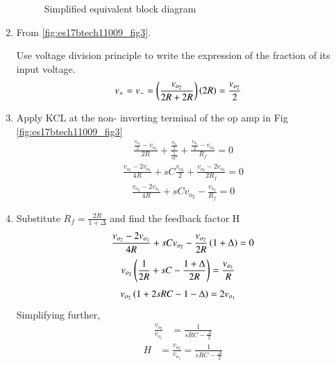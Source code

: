 \begin{enumerate}[label=\thesubsection.\arabic*.,ref=\thesubsection.\theenumi]
\renewcommand{\thefigure}{\theenumi.\arabic{figure}}
\begin{figure}[!ht]
	\begin{center}
		\resizebox{\columnwidth}{!}{}
	\end{center}
\caption{Simplified equivalent block diagram}
\label{fig:es17btech11009_block}
\end{figure}

\item
From \ref{fig:es17btech11009_fig3}.

Use voltage division principle to write the expression of the fraction of its input voltage.
\begin{align}
v_{+}&= v_{-}=\left(\frac{v_{o_2}}{2R + 2R}\right)\left(2R\right) = \frac{v_{o_2}}{2}
\end{align}
\item
Apply KCL at the non- inverting terminal of the op amp in Fig \ref{fig:es17btech11009_fig3}
\begin{align}
\frac{\frac{v_{0_2}}{2} - v_{o_1}}{2R} + \frac{\frac{v_{0_2}}{2}}{\frac{1}{sC}} + \frac{\frac{v_{0_2}}{2} - v_{o_2}}{R_{f}} =0
\end{align}
\begin{align}
\frac{v_{o_2} - 2v_{o_1}}{4R} + sC\frac{v_{o_2}}{2} + \frac{v_{o_2} - 2v_{o_2}}{2R_{f}} = 0
\end{align}
\begin{align}
\frac{v_{o_2} - 2v_{o_1}}{4R} + sCv_{o_2} -  \frac{v_{o_2}}{R_{f}} = 0
\end{align}
\item
Substitute $R_{f} = \frac{2R}{1 + \Delta}$ and find the feedback factor H
\begin{align}
\frac{v_{o_2} - 2v_{o_1}}{4R} + sCv_{o_2} -  \frac{v_{o_2}}{2R}\left(1 + \Delta\right) = 0
\end{align}
\begin{align}
v_{o_2}\left(\frac{1}{2R} + sC - \frac{1+ \Delta}{2R}\right)&= \frac{v_{o_1}}{R} 
\end{align}
\begin{align}
v_{o_2}\left(1 + 2sRC -1 - \Delta\right)&= 2v_{o_1}
\end{align}
Simplifying further,
\begin{align}
    \frac{v_{o_2}}{v_{o_1}}&= \frac{1}{sRC - \frac{\Delta}{2}}
\end{align}
\begin{align}
    H &=\frac{v_{o_2}}{v_{o_1}}= \frac{1}{sRC - \frac{\Delta}{2}}
    \label{eq:es17btech11009_H}
\end{align}


\end{enumerate}
